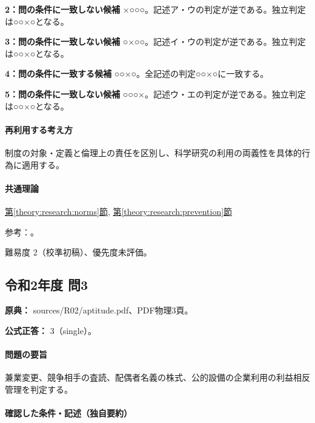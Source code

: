 \noindent\textbf{2：問の条件に一致しない候補} ×○○○。記述ア・ウの判定が逆である。独立判定は○○×○となる。\par

\noindent\textbf{3：問の条件に一致しない候補} ○×○○。記述イ・ウの判定が逆である。独立判定は○○×○となる。\par

\noindent\textbf{4：問の条件に一致する候補} ○○×○。全記述の判定○○×○に一致する。\par

\noindent\textbf{5：問の条件に一致しない候補} ○○○×。記述ウ・エの判定が逆である。独立判定は○○×○となる。\par

\paragraph{再利用する考え方} 制度の対象・定義と倫理上の責任を区別し、科学研究の利用の両義性を具体的行為に適用する。

\paragraph{共通理論} \hyperref[theory:research:norms]{第\ref*{theory:research:norms}節}, \hyperref[theory:research:prevention]{第\ref*{theory:research:prevention}節}

\par 参考：\cite{scj_code2013}。

\par 難易度 2（校準初稿）、優先度未評価。

\subsection{令和2年度 問3}
\label{q:r02-reg-apt-03}

\noindent\textbf{原典：} sources/R02/aptitude.pdf、PDF物理3頁。

\textbf{公式正答：} 3（single）。

\paragraph{問題の要旨} 兼業変更、競争相手の査読、配偶者名義の株式、公的設備の企業利用の利益相反管理を判定する。

\paragraph{確認した条件・記述（独自要約）}\mbox{}\par

